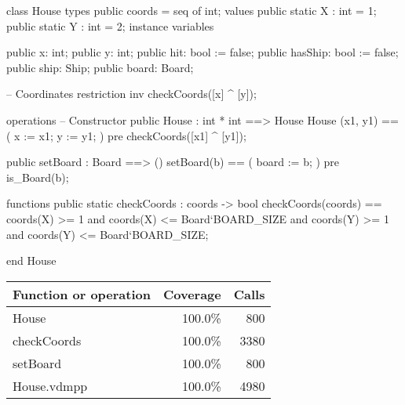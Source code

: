 \begin{vdm_al}
class House
 types
  public coords = seq of int;
 values
  public static X : int = 1;
  public static Y : int = 2;
 instance variables
 
 public x: int;
 public y: int;
 public hit: bool := false;
 public hasShip: bool := false;
 public ship: Ship;
 public board: Board;

 -- Coordinates restriction 
 inv checkCoords([x] ^ [y]);
 
 operations
  -- Constructor
  public House : int * int ==> House
   House (x1, y1) ==
   (
    x := x1;
    y := y1;
   )
  pre checkCoords([x1] ^ [y1]);
  
  public setBoard : Board ==> ()
   setBoard(b) ==
   (
    board := b;
   )
  pre is_Board(b);
 
 functions
  public static checkCoords : coords -> bool
   checkCoords(coords) ==
    coords(X) >= 1 and coords(X) <= Board`BOARD_SIZE and
    coords(Y) >= 1 and coords(Y) <= Board`BOARD_SIZE;
 
end House
\end{vdm_al}
\bigskip
\begin{longtable}{|l|r|r|}
\hline
Function or operation & Coverage & Calls \\
\hline
\hline
House & 100.0\% & 800 \\
\hline
checkCoords & 100.0\% & 3380 \\
\hline
setBoard & 100.0\% & 800 \\
\hline
\hline
House.vdmpp & 100.0\% & 4980 \\
\hline
\end{longtable}

